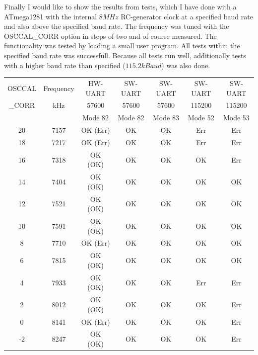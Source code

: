 Finally I would like to show the results from tests, which I have done with
a ATmega1281 with the internal \(8MHz\) RC-generator clock at a specified baud rate
and also above the specified baud rate.
The frequency was tuned with the OSCCAL\_CORR option in steps of two and
of course measured.
The functionality was tested by loading a small user program.
All tests within the specified baud rate was successfull.
Because all tests run well, additionally tests with a higher baud rate than
specified (\(115.2 kBaud\)) was also done.

\begin{table}[H]
  \begin{center}
    \begin{tabular}{| c | c || c | c | c || c | c |}
    \hline
   OSCCAL  & Frequency & HW-UART & SW-UART & SW-UART & SW-UART & SW-UART \\
   \_CORR  & kHz       & 57600   & 57600   & 57600   & 115200  & 115200  \\
           &           & Mode 82 & Mode 82 & Mode 83 & Mode 52 & Mode 53 \\
    \hline
    \hline
    20     &  7157   &  OK (Err)  &   OK     &   OK    &  Err    &   Err \\
    18     &  7217   &  OK (Err)  &   OK     &   OK    &  Err    &   Err \\
    \hline
    16     &  7318   &  OK (OK)   &   OK     &   OK    &  OK     &   Err \\
    14     &  7404   &  OK (OK)   &   OK     &   OK    &  OK     &   OK  \\
    \hline
    12     &  7521   &  OK (OK)   &   OK     &   OK    &  OK     &   OK  \\
    10     &  7591   &  OK (OK)   &   OK     &   OK    &  OK     &   OK  \\
    \hline
     8     &  7710   &  OK (Err)  &   OK     &   OK    &  OK     &   OK  \\
     6     &  7815   &  OK (OK)   &   OK     &   OK    &  OK     &   OK  \\
    \hline
     4     &  7933   &  OK (OK)   &   OK     &   OK    &  Err    &   Err \\
     2     &  8012   &  OK (OK)   &   OK     &   OK    &  OK     &   Err \\
    \hline
     0     &  8141   &  OK (Err)  &   OK     &   OK    &  OK     &   Err \\
    -2     &  8247   &  OK (OK)   &   OK     &   OK    &  OK     &   Err \\

\end{tabular}
\end{center}
\end{table}
